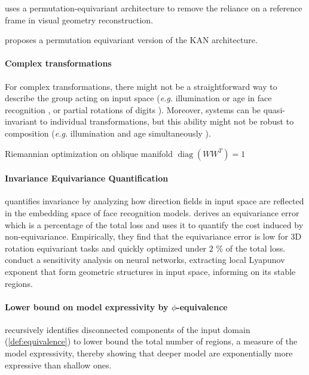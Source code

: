 \myline

\cite{wang2025} uses a permutation-equivariant architecture to remove the reliance on a reference frame in visual geometry reconstruction.

\myline

\cite{elbaz2025} proposes a permutation equivariant version of the KAN architecture\cite{liu2025c}.

\myline

\paragraph{Complex transformations} For complex transformations, there might not be a straightforward way to describe the group acting on input space (\textit{e.g.} illumination or age in face recognition \cite{bhattacharya20192sicaccpi}, or partial rotations of digits \cite{urbano2026}).
Moreover, systems can be quasi-invariant to individual transformations, but this ability might not be robust to composition (\textit{e.g.} illumination and age simultaneously \cite{bhattacharya20192sicaccpi}).

\myline

Riemannian optimization on oblique manifold $\operatorname{diag}(WW^T)=1$ \cite{badrinarayanan2015}

\myline

\paragraph{Invariance\/ Equivariance Quantification}
\cite{leroy2025} quantifies invariance by analyzing how direction fields in input space are reflected in the embedding space of face recognition models.
\cite{shen2026} derives an equivariance error which is a percentage of the total loss and uses it to quantify the cost induced by non-equivariance.
Empirically, they find that the equivariance error is low for 3D rotation equivariant tasks and quickly optimized under $2$ \% of the total loss.
\cite{storm2024prl} conduct a sensitivity analysis on neural networks, extracting local Lyapunov exponent that form geometric structures in input space, informing on its stable regions.

\paragraph{Lower bound on model expressivity by $\phi$-equivalence}
\cite{montufar2014anips} recursively identifies disconnected components of the input domain (\cref{def:equivalence}) to lower bound the total number of regions, a measure of the model expressivity, thereby showing that deeper model are exponentially more expressive than shallow ones.

